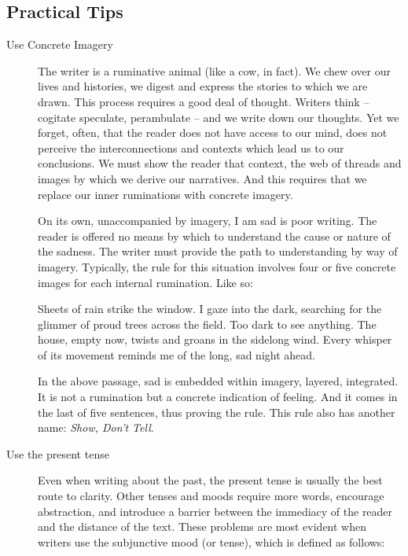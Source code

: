 \documentclass[letterpaper,10pt,headsepline]{scrreprt}
\begin{document}
\subsection{Practical Tips}

\begin{description}
\item [Use Concrete Imagery] The writer is a ruminative animal (like a cow, in fact). We chew over our lives and histories, we digest and express the stories to which we are drawn. This process requires a good deal of thought. Writers think -- cogitate speculate, perambulate -- and we write down our thoughts. Yet we forget, often, that the reader does not have access to our mind, does not perceive the interconnections and contexts which lead us to our conclusions. We must show the reader that context, the web of threads and images by which we derive our narratives. And this requires that we replace our inner ruminations with concrete imagery.

On its own, unaccompanied by imagery, \textsf{I am sad} is poor writing. The reader is offered no means by which to understand the cause or nature of the sadness. The writer must provide the path to understanding by way of imagery. Typically, the rule for this situation involves four or five concrete images for each internal rumination. Like so:
\vspace{1em}

\textsf{
Sheets of rain strike the window. I gaze into the dark, searching for  the glimmer of proud trees across the field. Too dark to see anything. The house, empty now, twists and groans in the sidelong wind. Every whisper of its movement reminds me of the long, sad night ahead.
}
\vspace{1em}

In the above passage, sad is embedded within imagery, layered, integrated. It is not a rumination but a concrete indication of feeling. And it comes in the last of five sentences, thus proving the rule. This rule also has another name: \textit{Show, Don't Tell}.

\item [Use the present tense] Even when writing about the past, the present tense is usually the best route to clarity. Other tenses and moods require more words, encourage abstraction, and introduce a barrier between the immediacy of the reader and the distance of the text. These problems are most evident when writers use the subjunctive mood (or tense), which is defined as follows:


\end{description}
\end{document}
